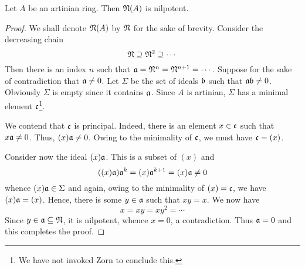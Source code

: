 \begin{lemma}
    Let $A$ be an artinian ring. Then $\mathfrak N(A)$ is nilpotent.
\end{lemma}
\begin{proof}
    We shall denote $\mathfrak N(A)$ by $\mathfrak N$ for the sake of brevity. Consider the decreasing chain 
    \begin{equation*}
        \mathfrak N\supseteq\mathfrak N^2\supseteq\cdots
    \end{equation*}
    Then there is an index $n$ such that $\mathfrak a = \mathfrak N^n = \mathfrak N^{n + 1} = \cdots$. Suppose for the sake of contradiction that $\mathfrak a\ne 0$. Let $\Sigma$ be the set of ideals $\mathfrak b$ such that $\mathfrak a\mathfrak b\ne 0$. Obviously $\Sigma$ is empty since it contains $\mathfrak a$. Since $A$ is artinian, $\Sigma$ has a minimal element $\mathfrak c$\footnote{We have not invoked Zorn to conclude this.}. 

    We contend that $\mathfrak c$ is principal. Indeed, there is an element $x\in\mathfrak c$ such that $x\mathfrak a\ne 0$. Thus, $(x)\mathfrak a\ne 0$. Owing to the minimality of $\mathfrak c$, we must have $\mathfrak c = (x)$. 

    Consider now the ideal $(x)\mathfrak a$. This is a subset of $(x)$ and 
    \begin{equation*}
        ((x)\mathfrak a)\mathfrak a^k = (x)\mathfrak a^{k + 1} = (x)\mathfrak a\ne0
    \end{equation*}
    whence $(x)\mathfrak a\in\Sigma$ and again, owing to the minimality of $(x) = \mathfrak c$, we have $(x)\mathfrak a = (x)$. Hence, there is some $y\in\mathfrak a$ such that $xy = x$. We now have 
    \begin{equation*}
        x = xy = xy^2 = \cdots
    \end{equation*}
    Since $y\in\mathfrak a\subseteq\mathfrak N$, it is nilpotent, whence $x = 0$, a contradiction. Thus $\mathfrak a = 0$ and this completes the proof.
\end{proof}

